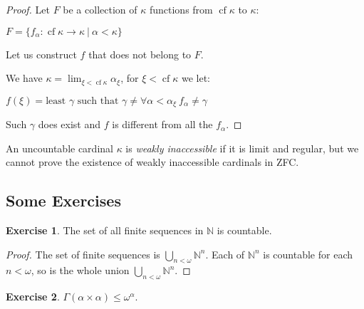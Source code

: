 \documentclass[8pt]{article}
\theoremstyle{definition}
\theoremstyle{definition}
\theoremstyle{definition}
\theoremstyle{definition}
\theoremstyle{definition}
\theoremstyle{definition}
\theoremstyle{definition}
\theoremstyle{definition}
\theoremstyle{definition}
\theoremstyle{definition}
\theoremstyle{definition}
\theoremstyle{definition}
\theoremstyle{definition}
\newtheorem{exercise}{Exercise}[section]
\theoremstyle{definition}
\theoremstyle{question}
\begin{document}
\begin{proof}

  Let $F$ be a collection of $\kappa$ functions from $\operatorname{cf} \kappa$ to $\kappa$:
  \begin{center}
    $F = \{ f_{\alpha} : \operatorname{cf} \kappa \to \kappa \: | \: \alpha < \kappa \}$
  \end{center}

  Let us construct $f$ that does not belong to $F$.

  We have $\kappa = \lim_{\xi < \operatorname{cf} \kappa} \alpha_{\xi}$, for $\xi < \operatorname{cf} \kappa$ we let:
  \begin{center}
    $f(\xi) = \text{least $\gamma$ such that $\gamma \neq \forall \alpha < \alpha_{\xi} \: f_{\alpha} \neq \gamma$}$
  \end{center}

  Such $\gamma$ does exist and $f$ is different from all the $f_{\alpha}$.
\end{proof}

An uncountable cardinal $\kappa$ is \emph{weakly inaccessible} if it is limit and regular, but we cannot prove the
existence of weakly inaccessible cardinals in ZFC.

\subsection{Some Exercises}

\begin{exercise}
  The set of all finite sequences in $\mathbb{N}$ is countable.
\end{exercise}

\begin{proof}
  The set of finite sequences is $\bigcup \limits_{n < \omega} \mathbb{N}^n$.
  Each of $\mathbb{N}^n$ is countable for each $n < \omega$, so is the whole union 
  $\bigcup \limits_{n < \omega} \mathbb{N}^n$.
\end{proof}

\begin{exercise}
  $\Gamma(\alpha \times \alpha) \leq \omega^{\alpha}$.
\end{exercise}
\end{document}
